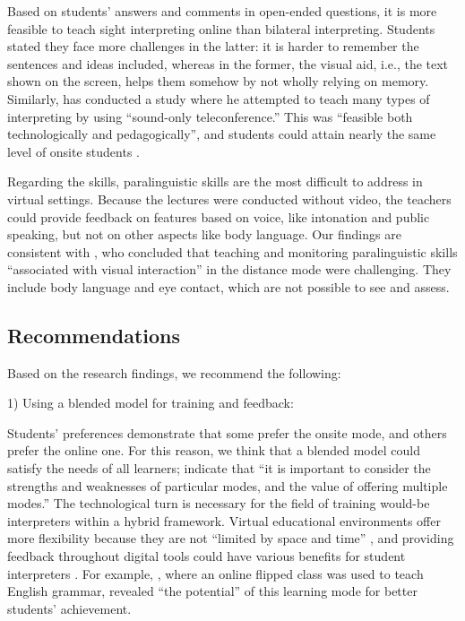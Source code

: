 \documentclass[english]{textolivre}
\begin{document}
Based on students’ answers and comments in open-ended questions, it is more feasible to teach sight interpreting online than bilateral interpreting. Students stated they face more challenges in the latter: it is harder to remember the sentences and ideas included, whereas in the former, the visual aid, i.e., the text shown on the screen, helps them somehow by not wholly relying on memory. Similarly, \textcite{ko_teaching_2009} has conducted a study where he attempted to teach many types of interpreting by using “sound-only teleconference.” This was “feasible both technologically and pedagogically”, and students could attain nearly the same level of onsite students \cite[p. 837-838]{ko_teaching_2009}.

Regarding the skills, paralinguistic skills are the most difficult to address in virtual settings. Because the lectures were conducted without video, the teachers could provide feedback on features based on voice, like intonation and public speaking, but not on other aspects like body language. Our findings are consistent with \textcite[p. 832]{ko_teaching_2009}, who concluded that teaching and monitoring paralinguistic skills “associated with visual interaction” in the distance mode were challenging. They include body language and eye contact, which are not possible to see and assess.  

\subsection{Recommendations}

Based on the research findings, we recommend the following:

1) Using a blended model for training and feedback:

Students’ preferences demonstrate that some prefer the onsite mode, and others prefer the online one. For this reason, we think that a blended model could satisfy the needs of all learners; \textcite[p. 1507]{ryan_feedback_2019} indicate that “it is important to consider the strengths and weaknesses of particular modes, and the value of offering multiple modes.” The technological turn is necessary for the field of training would-be interpreters within a hybrid framework.  Virtual educational environments offer more flexibility because they are not “limited by space and time” \cite[p. 9]{susilana_studentsa_2020}, and providing feedback throughout digital tools could have various benefits for student interpreters \cite[p. 156]{lee_feedback_2018}. For example, \textcite[p. 647]{ahmad_exploring_2021}, where an online flipped class was used to teach English grammar, revealed “the potential” of this learning mode for better students’ achievement.
\end{document}
